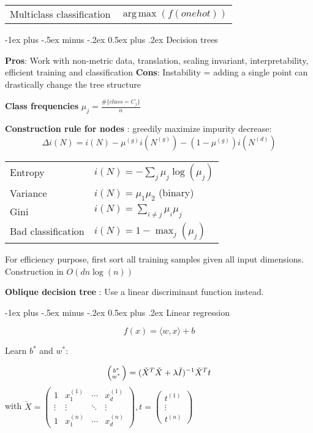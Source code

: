 \documentclass[10pt,landscape]{article}
\makeatletter
\DeclareMathOperator*{\argmax}{arg\,max}
\renewcommand{\section}{\@startsection{section}{1}{0mm}%
                                {-1ex plus -.5ex minus -.2ex}%
                                {0.5ex plus .2ex}%
                                {\normalfont\large\bfseries}}
\makeatother
\begin{document}
\begin{multicols}{3}
\begin{tabular}{@{}p{\the\MyLen}%
                @{}p{\linewidth-\the\MyLen}@{}}
Multiclass classification & $\argmax(f(onehot))$
\end{tabular}

\section{Decision trees}

\textbf{Pros}: Work with non-metric data, translation, scaling invariant, interpretability, efficient training and classification
\textbf{Cons}: Instability = adding a single point can drastically change the tree structure

\textbf{Class frequencies} $\mu_j = \frac{\#\{class = C_j\}}{n}$

\textbf{Construction rule for nodes} : greedily maximize impurity decrease:
$$\Delta i(N) = i(N) - \mu^{(g)} i(N^{(g)}) - (1 - \mu^{(g)}) i (N^{(d)})$$

\begin{tabular}{@{}p{\the\MyLen}%
                @{}p{\linewidth-\the\MyLen}@{}}
Entropy & $i(N) = -\sum_j \mu_j \log(\mu_j)$\\
Variance & $i(N) = \mu_1 \mu_2$ (binary)\\
Gini & $i(N) = \sum_{i \neq j} \mu_i \mu_j$\\
Bad classification & $i(N)=1 - \max_j(\mu_j)$


\end{tabular}

For efficiency purpose, first sort all training samples given all input dimensions. Construction in $O(dn \log(n))$

\textbf{Oblique decision tree} : Use a linear discriminant function instead.

\section{Linear regression}

$$f(x) = \langle w, x \rangle + b$$

Learn $b^*$ and $w^*$:

$$\Bigl(\negthinspace\begin{smallmatrix}b^* \\ w^* \end{smallmatrix}\Bigr) = (\check{X}^T\check{X} + \lambda \check{I})^{-1} \check{X}^T t$$
with $\check{X} =\begin{pmatrix}
1 & x_1^{(1)} & \cdots & x_d^{(1)}\\
\vdots &  \vdots &  \ddots &  \vdots\\
1 & x_1^{(n)} & \cdots & x_d^{(n)}\end{pmatrix}, t = \begin{pmatrix}t^{(1)} \\\vdots \\t^{(n)}\end{pmatrix}$


\end{multicols}
\end{document}
